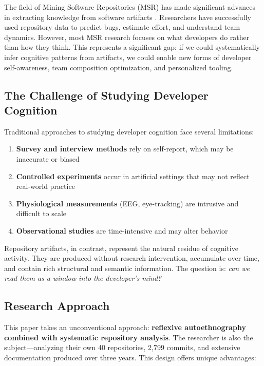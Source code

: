 \documentclass{ntlabs-preprint}
\begin{document}
The field of Mining Software Repositories (MSR) has made significant advances in extracting knowledge from software artifacts \citep{kagdi2007survey}. Researchers have successfully used repository data to predict bugs, estimate effort, and understand team dynamics. However, most MSR research focuses on what developers do rather than how they think. This represents a significant gap: if we could systematically infer cognitive patterns from artifacts, we could enable new forms of developer self-awareness, team composition optimization, and personalized tooling.

\subsection{The Challenge of Studying Developer Cognition}

Traditional approaches to studying developer cognition face several limitations:

\begin{enumerate}
    \item \textbf{Survey and interview methods} rely on self-report, which may be inaccurate or biased \citep{robillard2004how}
    \item \textbf{Controlled experiments} occur in artificial settings that may not reflect real-world practice \citep{ko2015practical}
    \item \textbf{Physiological measurements} (EEG, eye-tracking) are intrusive and difficult to scale
    \item \textbf{Observational studies} are time-intensive and may alter behavior
\end{enumerate}

Repository artifacts, in contrast, represent the natural residue of cognitive activity. They are produced without research intervention, accumulate over time, and contain rich structural and semantic information. The question is: \textit{can we read them as a window into the developer's mind?}

\subsection{Research Approach}

This paper takes an unconventional approach: \textbf{reflexive autoethnography combined with systematic repository analysis}. The researcher is also the subject---analyzing their own 40 repositories, 2{,}799 commits, and extensive documentation produced over three years. This design offers unique advantages:
\end{document}
